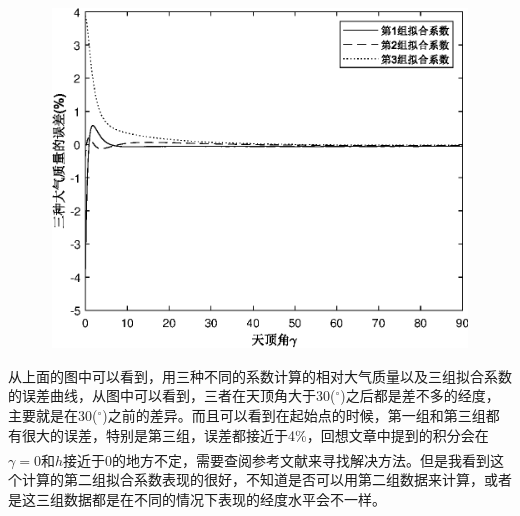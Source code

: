 \documentclass{aaa}
\makeatletter
\newcommand{\upcite}[1]{\textsuperscript{\textsuperscript{\cite{#1}}}}
\newcommand{\figcaption}{\def\@captype{figure}\caption}
\makeatother
\begin{document}
\begin{center}
	\includegraphics[width=16cm,height=9cm]{Error.eps}
	\figcaption{三种计算方法的误差曲线}
\end{center}

从上面的图中可以看到，用三种不同的系数计算的相对大气质量以及三组拟合系数的误差曲线，从图中可以看到，三者在天顶角大于30($^\circ$)之后都是差不多的经度，主要就是在30($^\circ$)之前的差异。而且可以看到在起始点的时候，第一组和第三组都有很大的误差，特别是第三组，误差都接近于4\%，回想文章中提到的积分会在$\gamma=0$和$h$接近于0的地方不定，需要查阅参考文献\upcite{bib:one}来寻找解决方法。但是我看到这个计算的第二组拟合系数表现的很好，不知道是否可以用第二组数据来计算，或者是这三组数据都是在不同的情况下表现的经度水平会不一样。
\end{document}
